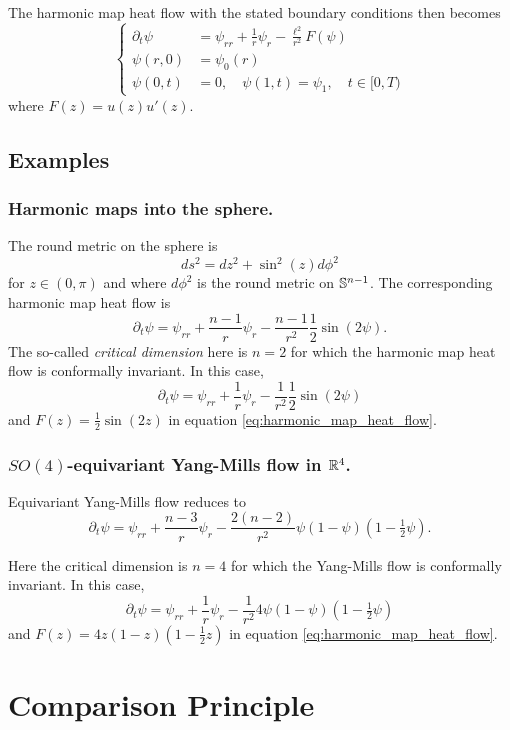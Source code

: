 \documentclass{amsart}
\begin{document}
The harmonic map heat flow with the stated boundary conditions then becomes
\begin{equation}
\label{eq:harmonic_map_heat_flow}
\begin{cases}
\partial_t \psi &= \psi_{rr} + \frac{1}{r} \psi_r - \frac{\ell^2}{r^2} F(\psi) \\
\psi(r, 0) &= \psi_0(r) \\
\psi(0, t) &= 0, \quad \psi(1, t) = \psi_1, \quad t \in [0, T)
\end{cases}
\end{equation}
where \(F(z) = u(z)u'(z)\).

\subsection*{Examples}

\subsubsection*{Harmonic maps into the sphere.}

The round metric on the sphere is
\[
ds^2 = dz^2 + \sin^2(z) d\phi^2
\]
for \(z \in (0, \pi)\) and where \(d\phi^2\) is the round metric on \(\S^{n-1}\). The corresponding harmonic map heat flow is
\[
\partial_t \psi = \psi_{rr} + \frac{n-1}{r} \psi_r - \frac{n-1}{r^2} \frac{1}{2} \sin (2\psi).
\]
The so-called \emph{critical dimension} here is \(n=2\) for which the harmonic map heat flow is conformally invariant. In this case,
\[
\partial_t \psi = \psi_{rr} + \frac{1}{r} \psi_r - \frac{1}{r^2} \frac{1}{2} \sin (2\psi)
\]
and \(F(z) = \tfrac{1}{2} \sin(2z)\) in equation \eqref{eq:harmonic_map_heat_flow}.

\subsubsection*{\(SO(4)\)-equivariant Yang-Mills flow in \(\R^4\).}

Equivariant Yang-Mills flow reduces to
\[
\partial_t \psi = \psi_{rr} + \frac{n-3}{r} \psi_r - \frac{2(n-2)}{r^2} \psi(1 - \psi)(1 - \tfrac{1}{2} \psi).
\]

Here the critical dimension is \(n=4\) for which the Yang-Mills flow is conformally invariant. In this case,
\[
\partial_t \psi = \psi_{rr} + \frac{1}{r} \psi_r - \frac{1}{r^2} 4 \psi(1 - \psi)(1 - \tfrac{1}{2} \psi)
\]
and \(F(z) = 4 z(1 - z)(1 - \tfrac{1}{2} z)\) in equation \eqref{eq:harmonic_map_heat_flow}.

\section{Comparison Principle}
\end{document}

